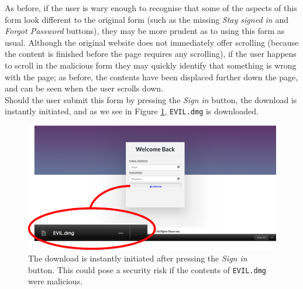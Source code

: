 As before, if the user is wary enough to recognise that some of the aspects of this form look different to the original form (such as the missing \textit{Stay signed in} and \textit{Forgot Password} buttons), they may be more prudent as to using this form as usual. Although the original website does not immediately offer scrolling (because the content is finished before the page requires any scrolling), if the user happens to scroll in the malicious form they may quickly identify that something is wrong with the page; as before, the contents have been displaced further down the page, and can be seen when the user scrolls down. \\

Should the user submit this form by pressing the \textit{Sign in} button, the download is instantly initiated, and as we see in Figure \ref{fig:download_completed}, \texttt{EVIL.dmg} is downloaded. \\

 \begin{figure}[h!]
 	\centering
 	\includegraphics[width=0.8\linewidth]{images/test_case_1/downloaded_evil.png}
 	\caption{The download is instantly initiated after pressing the \textit{Sign in} button. This could pose a security risk if the contents of \texttt{EVIL.dmg} were malicious.}
 	\label{fig:download_completed}
 \end{figure} 





















